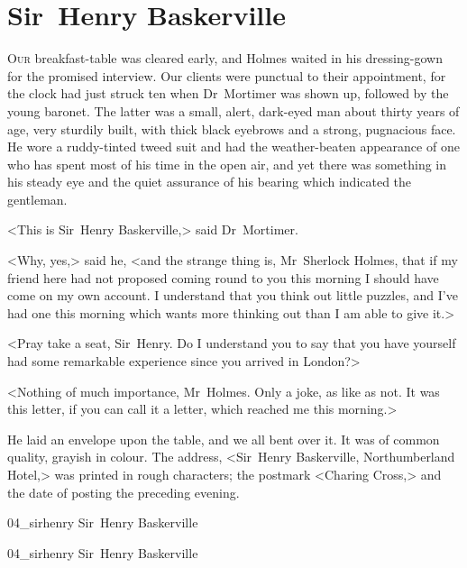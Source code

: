 \chapter{Sir~Henry Baskerville}
\lettrine[lines=4]{O}{ur} breakfast-table was cleared early, and Holmes waited in his dressing-gown for the promised interview. Our clients were punctual to their appointment, for the clock had just struck ten when Dr~Mortimer was shown up, followed by the young baronet. The latter was a small, alert, dark-eyed man about thirty years of age, very sturdily built, with thick black eyebrows and a strong, pugnacious face. He wore a ruddy-tinted tweed suit and had the weather-beaten appearance of one who has spent most of his time in the open air, and yet there was something in his steady eye and the quiet assurance of his bearing which indicated the gentleman.

<This is Sir~Henry Baskerville,> said Dr~Mortimer.

<Why, yes,> said he, <and the strange thing is, Mr~Sherlock Holmes, that if my friend here had not proposed coming round to you this morning I should have come on my own account. I understand that you think out little puzzles, and I've had one this morning which wants more thinking out than I am able to give it.>

<Pray take a seat, Sir~Henry. Do I understand you to say that you have yourself had some remarkable experience since you arrived in London?>

<Nothing of much importance, Mr~Holmes. Only a joke, as like as not. It was this letter, if you can call it a letter, which reached me this morning.>

He laid an envelope upon the table, and we all bent over it. It was of common quality, grayish in colour. The address, <Sir~Henry Baskerville, Northumberland Hotel,> was printed in rough characters; the postmark <Charing Cross,> and the date of posting the preceding evening.



\begin{letter}
	\begin{bwbigpic}
		[0.9] 
		{04_sirhenry}
		{Sir~Henry Baskerville}
	\end{bwbigpic}
\end{letter}
\begin{a4}
	\begin{bwbigpic}
		[0.8] 
		{04_sirhenry}
		{Sir~Henry Baskerville}
	\end{bwbigpic}
\end{a4}

